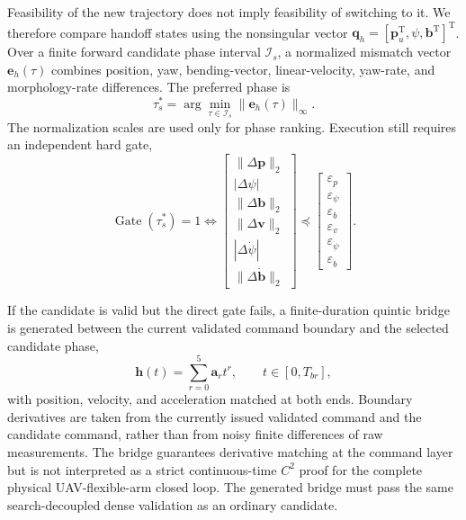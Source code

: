 \documentclass[journal,twoside]{IEEEtran}
\begin{document}
Feasibility of the new trajectory does not imply feasibility of switching to it. We therefore compare handoff states using the nonsingular vector $\mathbf q_h=[\mathbf p_u^{\mathrm T},\psi,\mathbf b^{\mathrm T}]^{\mathrm T}$. Over a finite forward candidate phase interval $\mathcal I_s$, a normalized mismatch vector $\mathbf e_h(\tau)$ combines position, yaw, bending-vector, linear-velocity, yaw-rate, and morphology-rate differences. The preferred phase is
\begin{equation}
\tau_s^*=\arg\min_{\tau\in\mathcal I_s}\|\mathbf e_h(\tau)\|_\infty.
\label{eq:phase_match}
\end{equation}
The normalization scales are used only for phase ranking. Execution still requires an independent hard gate,
\begin{equation}
\operatorname{Gate}(\tau_s^*)=1
\iff
\begin{bmatrix}
\|\Delta\mathbf p\|_2\\|\Delta\psi|\\\|\Delta\mathbf b\|_2\\
\|\Delta\mathbf v\|_2\\|\Delta\dot\psi|\\\|\Delta\dot{\mathbf b}\|_2
\end{bmatrix}
\preceq
\begin{bmatrix}
\varepsilon_p\\\varepsilon_\psi\\\varepsilon_b\\
\varepsilon_v\\\varepsilon_{\dot\psi}\\\varepsilon_{\dot b}
\end{bmatrix}.
\label{eq:handoff_gate}
\end{equation}

If the candidate is valid but the direct gate fails, a finite-duration quintic bridge is generated between the current validated command boundary and the selected candidate phase,
\begin{equation}
\mathbf h(t)=\sum_{r=0}^{5}\mathbf a_rt^r,
\qquad t\in[0,T_{br}],
\label{eq:quintic_bridge}
\end{equation}
with position, velocity, and acceleration matched at both ends. Boundary derivatives are taken from the currently issued validated command and the candidate command, rather than from noisy finite differences of raw measurements. The bridge guarantees derivative matching at the command layer but is not interpreted as a strict continuous-time $C^2$ proof for the complete physical UAV-flexible-arm closed loop. The generated bridge must pass the same search-decoupled dense validation as an ordinary candidate.
\end{document}
